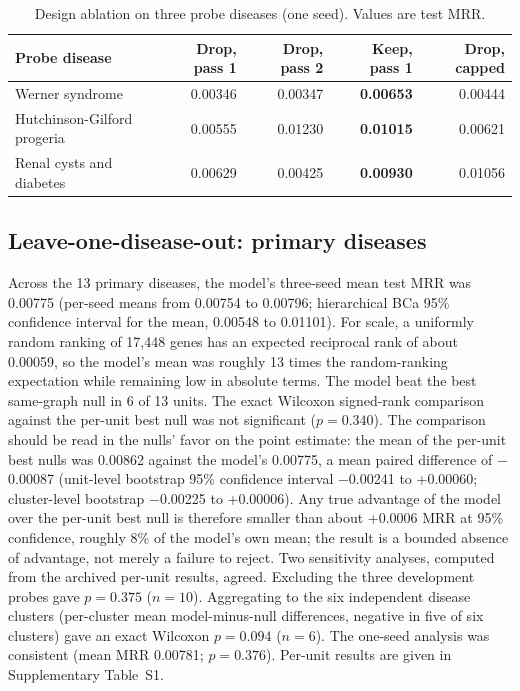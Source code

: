 \documentclass[11pt]{article}
\begin{document}
\begin{table}[t]
\centering
\small
\caption{Design ablation on three probe diseases (one seed). Values are test MRR.}
\label{tab:ablation}
\begin{tabularx}{\textwidth}{@{}L r r r r@{}}
\toprule
\textbf{Probe disease} & \textbf{Drop, pass 1} & \textbf{Drop, pass 2} & \textbf{Keep, pass 1} & \textbf{Drop, capped} \\
\midrule
Werner syndrome & 0.00346 & 0.00347 & \textbf{0.00653} & 0.00444 \\
Hutchinson-Gilford progeria & 0.00555 & 0.01230 & \textbf{0.01015} & 0.00621 \\
Renal cysts and diabetes & 0.00629 & 0.00425 & \textbf{0.00930} & 0.01056 \\
\bottomrule
\end{tabularx}
\end{table}

\subsection{Leave-one-disease-out: primary diseases}

Across the 13 primary diseases, the model's three-seed mean test MRR was 0.00775 (per-seed means from 0.00754 to 0.00796; hierarchical BCa 95\% confidence interval for the mean, 0.00548 to 0.01101). For scale, a uniformly random ranking of 17,448 genes has an expected reciprocal rank of about 0.00059, so the model's mean was roughly 13 times the random-ranking expectation while remaining low in absolute terms. The model beat the best same-graph null in 6 of 13 units. The exact Wilcoxon signed-rank comparison against the per-unit best null was not significant ($p = 0.340$). The comparison should be read in the nulls' favor on the point estimate: the mean of the per-unit best nulls was 0.00862 against the model's 0.00775, a mean paired difference of $-$0.00087 (unit-level bootstrap 95\% confidence interval $-$0.00241 to +0.00060; cluster-level bootstrap $-$0.00225 to +0.00006). Any true advantage of the model over the per-unit best null is therefore smaller than about +0.0006 MRR at 95\% confidence, roughly 8\% of the model's own mean; the result is a bounded absence of advantage, not merely a failure to reject. Two sensitivity analyses, computed from the archived per-unit results, agreed. Excluding the three development probes gave $p = 0.375$ ($n = 10$). Aggregating to the six independent disease clusters (per-cluster mean model-minus-null differences, negative in five of six clusters) gave an exact Wilcoxon $p = 0.094$ ($n = 6$). The one-seed analysis was consistent (mean MRR 0.00781; $p = 0.376$). Per-unit results are given in Supplementary Table~S1.
\end{document}
